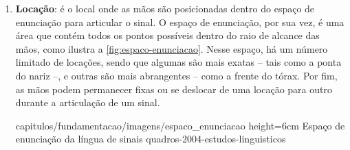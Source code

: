 \begin{enumerate}


    \item \textbf{Locação}: é o local onde as mãos são posicionadas dentro do espaço de enunciação para articular o sinal. O espaço de enunciação, por sua vez, é uma área que contém todos os pontos possíveis dentro do raio de alcance das mãos, como ilustra a \autoref{fig:espaco-enunciacao}. Nesse espaço, há um número limitado de locações, sendo que algumas são mais exatas -- tais como a ponta do nariz --, e outras são mais abrangentes -- como a frente do tórax. Por fim, as mãos podem permanecer fixas ou se deslocar de uma locação para outro durante a articulação de um sinal.
    
        {capitulos/fundamentacao/imagens/espaco_enunciacao} %
        {height=6cm} %
        {Espaço de enunciação da língua de sinais} %
        {quadros-2004-estudos-linguisticos} %







\end{enumerate}
